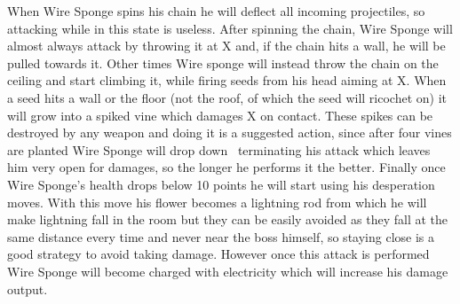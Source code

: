 When Wire Sponge spins his chain he will deflect all incoming projectiles, so attacking while in this state is useless. After spinning the chain, Wire Sponge will almost always attack by throwing it at X and, if the chain hits a wall, he will be pulled towards it. Other times Wire sponge will instead throw the chain on the ceiling and start climbing it, while firing seeds from his head aiming at X. When a seed hits a wall or the floor (not the roof, of which the seed will ricochet on) it will grow into a spiked vine which damages X on contact. These spikes can be destroyed by any weapon and doing it is a suggested action, since after four vines are planted Wire Sponge will drop down~\cite{rta:x2} terminating his attack which leaves him very open for damages, so the longer he performs it the better. Finally once Wire Sponge's health drops below 10 points he will start using his desperation moves. With this move his flower becomes a lightning rod from which he will make lightning fall in the room but they can be easily avoided as they fall at the same distance every time and never near the boss himself, so staying close is a good strategy to avoid taking damage. However once this attack is performed Wire Sponge will become charged with electricity which will increase his damage output.
